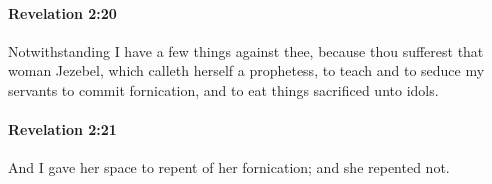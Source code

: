		\paragraph{Revelation 2:20} %
			\label{REVELATIONNT-2-20}

			Notwithstanding I have a few things against thee, because thou sufferest that woman Jezebel, which calleth herself a prophetess, to teach and to seduce my servants to commit fornication, and to eat things sacrificed unto idols.

			\begin{framed}
			\scriptsize
				\begin{compactdesc}
					\item[SBLG] 
				\end{compactdesc}
			\end{framed}

		\paragraph{Revelation 2:21} %
			\label{REVELATIONNT-2-21}

			And I gave her space to repent of her fornication; and she repented not.

